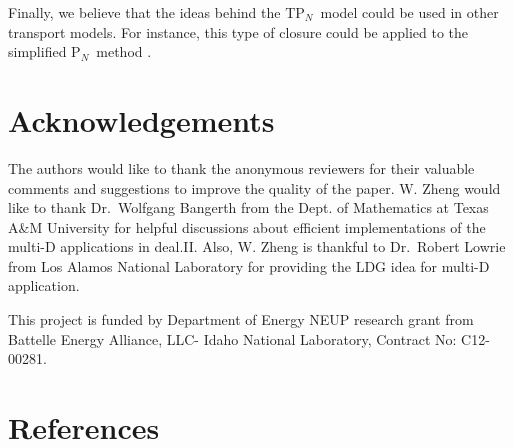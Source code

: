 \documentclass[review]{elsarticle}
\newcommand{\pn}{P$_N$}
\newcommand{\dn}{D$_N$}
\begin{document}
Finally, we believe that the ideas behind the T\pn~model could be used in other transport models. For instance, this type of closure could be applied to the simplified \pn~method \cite{McClarren:2011ga}. 

\section*{Acknowledgements}
The authors would like to thank the anonymous reviewers for their valuable comments and suggestions to improve the quality of the paper. W. Zheng would like to thank Dr.\ Wolfgang Bangerth from the Dept. of Mathematics at Texas A\&M University for helpful discussions about efficient implementations of the multi-D applications in deal.II. Also, W. Zheng is thankful to Dr.\ Robert Lowrie from Los Alamos National Laboratory for providing the LDG idea for multi-D application.

This project is funded by Department of Energy NEUP research grant from Battelle Energy Alliance, LLC- Idaho National Laboratory, Contract No: C12-00281.


\section*{References}

\end{document}
